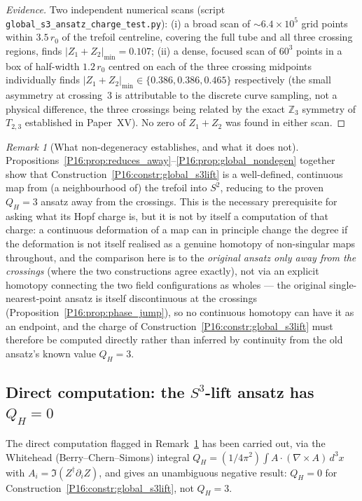 \documentclass[11pt,a4paper]{article}
\theoremstyle{definition}\newtheorem{definition}[theorem]{Definition}
\theoremstyle{remark}
\newtheorem{remark}[theorem]{Remark}
\theoremstyle{definition}\newtheorem{construction}[theorem]{Construction}
\newcommand{\QH}{Q_H}
\begin{document}
\begin{proof}[Evidence]
Two independent numerical scans (script
\texttt{global\_s3\_ansatz\_charge\_test.py}): (i) a broad scan of
$\sim6.4\times10^5$ grid points within $3.5\,r_0$ of the trefoil
centreline, covering the full tube and all three crossing regions,
finds $|Z_1+Z_2|_{\min}=0.107$; (ii) a dense, focused scan of
$60^3$ points in a box of half-width $1.2\,r_0$ centred on each of
the three crossing midpoints individually finds
$|Z_1+Z_2|_{\min}\in\{0.386,0.386,0.465\}$ respectively (the small
asymmetry at crossing~3 is attributable to the discrete curve
sampling, not a physical difference, the three crossings being
related by the exact $\mathbb{Z}_3$ symmetry of $T_{2,3}$ established
in Paper~XV). No zero of $Z_1+Z_2$ was found in either scan.
\end{proof}

\begin{remark}[What non-degeneracy establishes, and what it does not]
\label{P16:rem:nondegen_scope}
Propositions~\ref{P16:prop:reduces_away}--\ref{P16:prop:global_nondegen}
together show that Construction~\ref{P16:constr:global_s3lift} is a
well-defined, continuous map from (a neighbourhood of) the trefoil
into $S^2$, reducing to the proven $\QH=3$ ansatz away from the
crossings. This is the necessary prerequisite for asking what its
Hopf charge is, but it is not by itself a computation of that charge:
a continuous deformation of a map can in principle change the degree
if the deformation is not itself realised as a genuine homotopy of
non-singular maps throughout, and the comparison here is to the
\emph{original ansatz only away from the crossings} (where the two
constructions agree exactly), not via an explicit homotopy connecting
the two field configurations as wholes --- the original
single-nearest-point ansatz is itself discontinuous at the crossings
(Proposition~\ref{P16:prop:phase_jump}), so no continuous homotopy can
have it as an endpoint, and the charge of
Construction~\ref{P16:constr:global_s3lift} must therefore be computed
directly rather than inferred by continuity from the old ansatz's
known value $\QH=3$.
\end{remark}

\subsection{Direct computation: the $S^3$-lift ansatz has $\QH=0$}
\label{P16:sec:s3lift_charge_zero}

The direct computation flagged in Remark~\ref{P16:rem:nondegen_scope} has
been carried out, via the Whitehead (Berry--Chern--Simons) integral
$\QH=(1/4\pi^2)\int A\cdot(\nabla\times A)\,d^3x$ with
$A_i=\Im(Z^\dagger\partial_iZ)$, and gives an unambiguous negative
result: $\QH=0$ for Construction~\ref{P16:constr:global_s3lift}, not
$\QH=3$.
\end{document}
